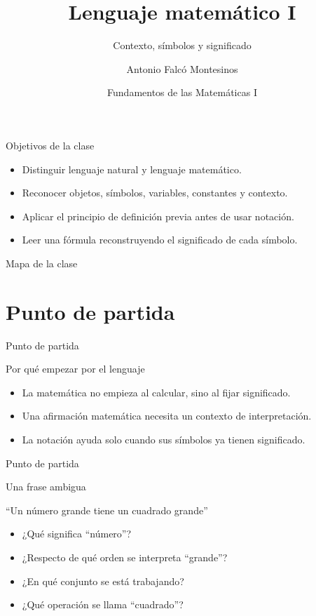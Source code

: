 \documentclass[aspectratio=169,11pt]{beamer}
\title[FdM I -- Clase 01]{Lenguaje matemático I}
\subtitle{Contexto, símbolos y significado}
\author{Antonio Falcó Montesinos}
\institute{Universidad CEU Cardenal Herrera}
\date{Fundamentos de las Matemáticas I}
\begin{document}
\begin{frame}
  \titlepage
\end{frame}

\begin{frame}{Objetivos de la clase}
\begin{itemize}
  \item Distinguir lenguaje natural y lenguaje matemático.
  \item Reconocer objetos, símbolos, variables, constantes y contexto.
  \item Aplicar el principio de definición previa antes de usar notación.
  \item Leer una fórmula reconstruyendo el significado de cada símbolo.
\end{itemize}
\end{frame}

\begin{frame}{Mapa de la clase}
\tableofcontents
\end{frame}

\section{Punto de partida}

\begin{frame}{Punto de partida}
\begin{block}{Por qué empezar por el lenguaje}
\begin{itemize}
  \item La matemática no empieza al calcular, sino al fijar significado.
  \item Una afirmación matemática necesita un contexto de interpretación.
  \item La notación ayuda solo cuando sus símbolos ya tienen significado.
\end{itemize}
\end{block}
\end{frame}

\begin{frame}{Punto de partida}
\begin{block}{Una frase ambigua}
\begin{center}
  \Large ``Un número grande tiene un cuadrado grande''
\end{center}
\vspace{0.2cm}
\begin{itemize}
  \item ¿Qué significa ``número''?
  \item ¿Respecto de qué orden se interpreta ``grande''?
  \item ¿En qué conjunto se está trabajando?
  \item ¿Qué operación se llama ``cuadrado''?
\end{itemize}
\end{block}
\end{frame}
\end{document}
